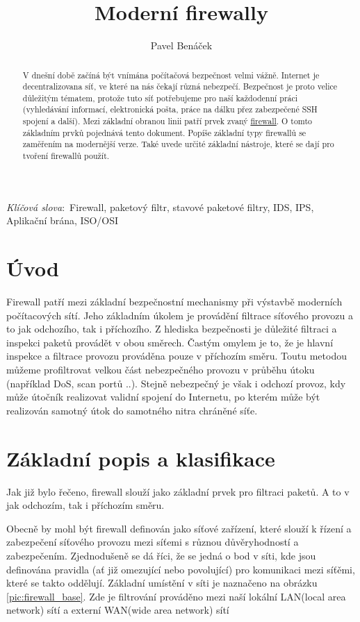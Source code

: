 \documentclass[11pt,twoside,a4paper]{article}
\title{Moderní firewally}
\author{Pavel Benáček}
\def\keywords{\vspace{.5em}
{\textit{Klíčová slova}:\,\relax%
}}
\begin{document}
\maketitle

\begin{abstract}

V dnešní době začíná být vnímána počítačová bezpečnost velmi vážně. Internet je decentralizovana síť, ve které na nás čekají různá nebezpečí. Bezpečnost je proto velice důležitým tématem, protože tuto síť potřebujeme pro naší každodenní práci (vyhledávání informací, elektronická pošta, práce na dálku přez zabezpečené SSH spojení a další). Mezi základní obranou linii patří prvek zvaný \underline{firewall}. O tomto základním prvků pojednává tento dokument. Popíše základní typy firewallů se zaměřením na modernější verze. Také uvede určité základní nástroje, které se dají pro tvoření firewallů použít.
\end{abstract}

\keywords{Firewall, paketový filtr, stavové paketové filtry, IDS, IPS, Aplikační brána, ISO/OSI}

\tableofcontents

\section{Úvod}

Firewall patří mezi základní bezpečnostní mechanismy při výstavbě moderních počítacových sítí. Jeho základním úkolem je provádění filtrace síťového provozu a to jak odchozího, tak i příchozího. Z hlediska bezpečnosti je důležité filtraci a inspekci paketů provádět v obou směrech. Častým omylem je to, že je hlavní inspekce a filtrace provozu prováděna pouze v příchozím směru. Toutu metodou můžeme profiltrovat velkou část nebezpečného provozu v průběhu útoku (například DoS, scan portů ..). Stejně nebezpečný je však i odchozí provoz, kdy může útočník realizovat validní spojení do Internetu, po kterém může být realizován samotný útok do samotného nitra chráněné síťe.
 
\section{Základní popis a klasifikace}\label{sec:defend} 

Jak již bylo řečeno, firewall slouží jako základní prvek pro filtraci paketů. A to v jak odchozím, tak i příchozím směru.

Obecně by mohl být firewall definován jako síťové zařízení, které slouží k řízení a zabezpečení síťového provozu mezi síťemi s různou důvěryhodností a zabezpečením. Zjednodušeně se dá říci, že se jedná o bod v síti, kde jsou definována pravidla (ať již omezující nebo povolující) pro komunikaci mezi síťěmi, které se takto oddělují. Základní umístění v síti je naznačeno na obrázku \ref{pic:firewall_base}. Zde je filtrování prováděno mezi naší lokální LAN(local area network) sítí a externí WAN(wide area network) sítí
\end{document}
